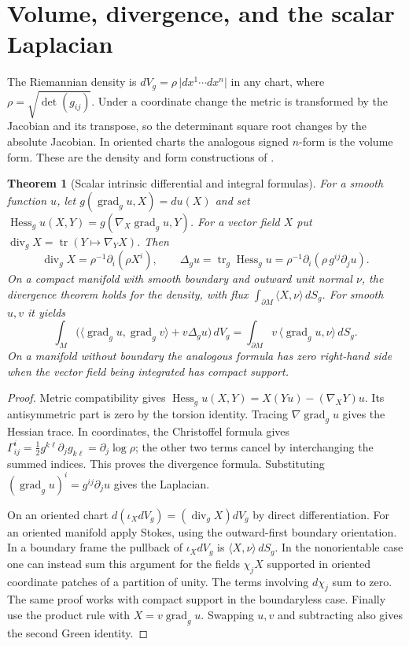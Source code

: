 \documentclass[11pt,oneside,openany]{book}
\theoremstyle{plain}
\newtheorem{theorem}{Theorem}[chapter]
\theoremstyle{definition}
\theoremstyle{remark}
\begin{document}
\section{Volume, divergence, and the scalar Laplacian}\label{p202:G02}

The Riemannian density is \(dV_g=\rho\,\lvert dx^1\cdots dx^n\rvert\)
in any chart, where \(\rho=\sqrt{\det(g_{ij})}\). Under a coordinate
change the metric is transformed by the Jacobian and its transpose,
so the determinant square root changes by the absolute Jacobian.
In oriented charts the analogous signed \(n\)-form is the volume
form. These are the density and form constructions of
\cite[Chapters 9--10]{P104}.

\begin{theorem}[Scalar intrinsic differential and integral formulas]
\label{thm:p202-green}
For a smooth function \(u\), let \(g(\operatorname{grad}_g u,X)=du(X)\)
and set \(\operatorname{Hess}_g u(X,Y)=g(\nabla_X\operatorname{grad}_g u,Y)\).
For a vector field \(X\) put \(\operatorname{div}_g X=\operatorname{tr}(Y\mapsto\nabla_Y X)\).
Then
\[
 \operatorname{div}_g X=\rho^{-1}\partial_i(\rho X^i),
 \qquad
 \Delta_g u=\operatorname{tr}_g\operatorname{Hess}_g u
           =\rho^{-1}\partial_i(\rho\,g^{ij}\partial_j u).
\]
On a compact manifold with smooth boundary and outward unit normal
\(\nu\), the divergence theorem holds for the density, with flux
\(\int_{\partial M}\langle X,\nu\rangle\,dS_g\).
For smooth \(u,v\) it yields
\[
 \int_M\bigl(\langle\operatorname{grad}_g u,\operatorname{grad}_g v\rangle
                      +v\Delta_g u\bigr)\,dV_g
   =\int_{\partial M} v\,\langle\operatorname{grad}_g u,\nu\rangle\,dS_g .
\]
On a manifold without boundary the analogous formula has zero
right-hand side when the vector field being integrated has compact
support.
\end{theorem}

\begin{proof}
Metric compatibility gives
\(\operatorname{Hess}_g u(X,Y)=X(Yu)-(\nabla_XY)u\).
Its antisymmetric part is zero by the torsion identity. Tracing
\(\nabla\operatorname{grad}_g u\) gives the Hessian trace.
In coordinates, the Christoffel formula gives
\(\Gamma^i_{ij}=\tfrac12g^{k\ell}\partial_jg_{k\ell}
=\partial_j\log\rho\); the other two terms cancel by interchanging
the summed indices. This proves the divergence formula. Substituting
\((\operatorname{grad}_g u)^i=g^{ij}\partial_j u\) gives the Laplacian.

On an oriented chart
\(d(\iota_X dV_g)=(\operatorname{div}_g X)dV_g\) by direct
differentiation. For an oriented manifold apply Stokes, using the
outward-first boundary orientation. In a boundary frame the pullback
of \(\iota_X dV_g\) is \(\langle X,\nu\rangle\,dS_g\).
In the nonorientable case one can instead sum this argument for
the fields \(\chi_j X\) supported in oriented coordinate patches of a
partition of unity. The terms involving \(d\chi_j\) sum to zero.
The same proof works with compact support in the boundaryless case.
Finally use the product rule with \(X=v\operatorname{grad}_g u\).
Swapping \(u,v\) and subtracting also gives the second Green identity.
\end{proof}
\end{document}
